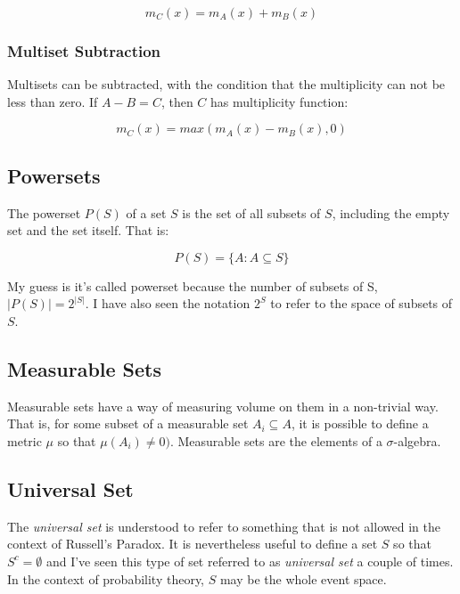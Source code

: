 \begin{equation}
m_C(x) = m_A(x) + m_B(x)
\end{equation} 

\subsubsection{Multiset Subtraction}
Multisets can be subtracted, with the condition that the multiplicity can not be less than zero. If $A- B = C$, then $C$ has multiplicity function:

\begin{equation}
m_C(x) = max\left(m_A(x) - m_B(x), 0\right)
\end{equation}

\subsection{Powersets}
The powerset $P(S)$ of a set $S$ is the set of all subsets of $S$, including the empty set and the set itself. That is:

\begin{equation}
P(S) = \{ A : A\subseteq S\}
\end{equation}

My guess is it's called powerset because the number of subsets of S, $|P(S)| = 2^{|S|}$. I have also seen the notation $2^S$ to refer to the space of subsets of $S$.



\subsection{Measurable Sets}
Measurable sets have a way of measuring volume on them in a non-trivial way. That is, for some subset of a measurable set $A_i \subseteq A$, it is possible to define a metric $\mu$ so that $\mu(A_i) \neq0)$. Measurable sets are the elements of a $\sigma$-algebra. 

\subsection{Universal Set}
The \textit{universal set} is understood to refer to something that is not allowed in the context of Russell's Paradox. It is nevertheless useful to define a set $S$ so that $S^c = \emptyset$ and I've seen this type of set referred to as \textit{universal set} a couple of times. In the context of probability theory, $S$ may be the whole event space.




